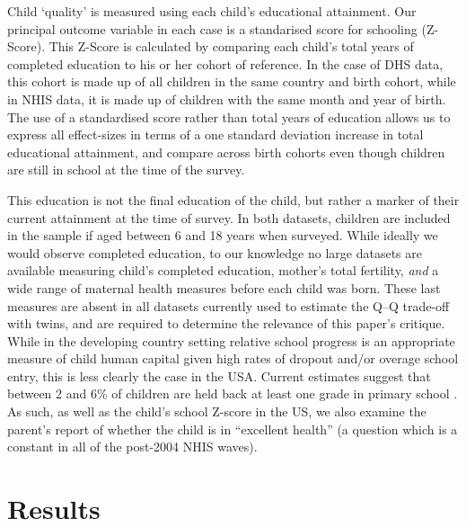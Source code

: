 \documentclass[subeqn]{article}
\begin{document}
\begin{spacing}{1.4}
Child `quality' is measured using each child's educational attainment. Our 
principal outcome variable in each case is a standarised score for schooling 
(Z-Score). This Z-Score is calculated by comparing each child's total years of 
completed education to his or her cohort of reference.  In the case of DHS data,
this cohort is made up of all children in the same country and birth cohort, 
while in NHIS data, it is made up of children with the same month and year of 
birth. The use of a standardised score rather than total years of education
allows us to express all effect-sizes in terms of a one standard deviation
increase in total educational attainment, and compare across birth cohorts
even though children are still in school at the time of the survey.

This education is not the final education of the child, but rather a marker of
their current attainment at the time of survey.  In both datasets, children are
included in the sample if aged between 6 and 18 years when surveyed.  While
ideally we would observe completed education, to our knowledge no large datasets
are available measuring child's completed education, mother's total fertility,
\emph{and} a wide range of maternal health measures before each child was born.
These last measures are absent in all datasets currently used to estimate the
Q--Q trade-off with twins, and are required to determine the relevance of this
paper's critique.  While in the developing country setting relative school
progress is an appropriate measure of child human capital given high rates of
dropout and/or overage school entry, this is less clearly the case in the USA.
Current estimates suggest that between 2 and 6\% of children are held back at
least one grade in primary school \citep{Warrenetal2014}.  As such, as well
as the child's school Z-score in the US, we also examine the parent's report of
whether the child is in ``excellent health'' (a question which is a constant in
all of the post-2004 NHIS waves).

\section{Results}                                  \label{TWINscn:results}

\end{spacing}
\end{document}
